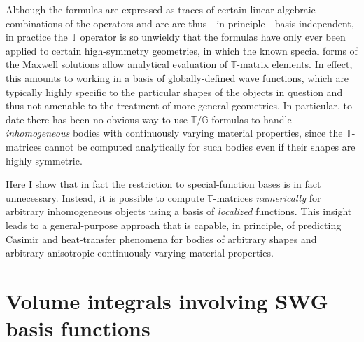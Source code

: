 \documentclass[letterpaper]{article}
\begin{document}
Although the formulas are expressed as traces of 
certain linear-algebraic combinations of the operators 
and are are thus---in principle---basis-independent, in practice the 
$\mathbb{T}$ operator is so unwieldy that the formulas have only
ever been applied to certain high-symmetry geometries, in which
the known special forms of the Maxwell solutions allow 
analytical evaluation of $\mathbb{T}$-matrix elements.
In effect, this amounts to working in a basis of globally-defined
wave functions, which are typically highly specific to the 
particular shapes of the objects in question and thus not 
amenable to the treatment of more general geometries.
In particular, to date there has been no obvious way to use
$\mathbb{T}/\mathbb{G}$ formulas to handle \textit{inhomogeneous}
bodies with continuously varying material properties, since 
the $\mathbb{T}$-matrices cannot be computed analytically
for such bodies even if their shapes are highly symmetric.

Here I show that in fact the restriction to special-function
bases is in fact unnecessary. Instead, it is possible to compute 
$\mathbb{T}$-matrices \textit{numerically} for arbitrary 
inhomogeneous objects using a basis of \textit{localized} 
functions. This insight leads to a general-purpose approach
that is capable, in principle, of predicting Casimir and 
heat-transfer phenomena for bodies of arbitrary shapes and
arbitrary anisotropic continuously-varying material properties. 


\appendix 

\section{Volume integrals involving SWG basis functions}
\end{document}
